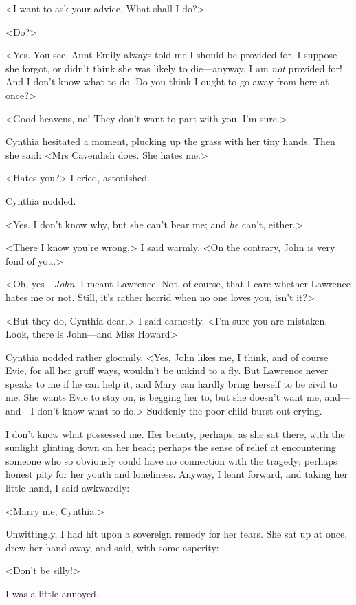  <I want to ask your advice. What shall I do?> 

 <Do?> 

 <Yes. You see, Aunt Emily always told me I should be provided for. I suppose she forgot, or didn't think she was likely to die—anyway, I am \emph{not} provided for! And I don't know what to do. Do you think I ought to go away from here at once?> 

 <Good heavens, no! They don't want to part with you, I'm sure.> 

 Cynthia hesitated a moment, plucking up the grass with her tiny hands. Then she said: <Mrs Cavendish does. She hates me.> 

 <Hates you?> I cried, astonished. 

 Cynthia nodded. 

 <Yes. I don't know why, but she can't bear me; and \emph{he} can't, either.> 

 <There I know you're wrong,> I said warmly. <On the contrary, John is very fond of you.> 

 <Oh, yes—\emph{John}. I meant Lawrence. Not, of course, that I care whether Lawrence hates me or not. Still, it's rather horrid when no one loves you, isn't it?> 

 <But they do, Cynthia dear,> I said earnestly. <I'm sure you are mistaken. Look, there is John—and Miss Howard\longdash> 

 Cynthia nodded rather gloomily. <Yes, John likes me, I think, and of course Evie, for all her gruff ways, wouldn't be unkind to a fly. But Lawrence never speaks to me if he can help it, and Mary can hardly bring herself to be civil to me. She wants Evie to stay on, is begging her to, but she doesn't want me, and—and—I don't know what to do.> Suddenly the poor child burst out crying. 

 I don't know what possessed me. Her beauty, perhaps, as she sat there, with the sunlight glinting down on her head; perhaps the sense of relief at encountering someone who so obviously could have no connection with the tragedy; perhaps honest pity for her youth and loneliness. Anyway, I leant forward, and taking her little hand, I said awkwardly: 

 <Marry me, Cynthia.> 

 Unwittingly, I had hit upon a sovereign remedy for her tears. She sat up at once, drew her hand away, and said, with some asperity: 

 <Don't be silly!> 

 I was a little annoyed. 

